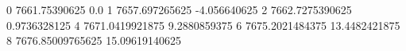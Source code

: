 0 7661.75390625 0.0
1 7657.697265625 -4.056640625
2 7662.7275390625 0.9736328125
4 7671.0419921875 9.2880859375
6 7675.2021484375 13.4482421875
8 7676.85009765625 15.09619140625
